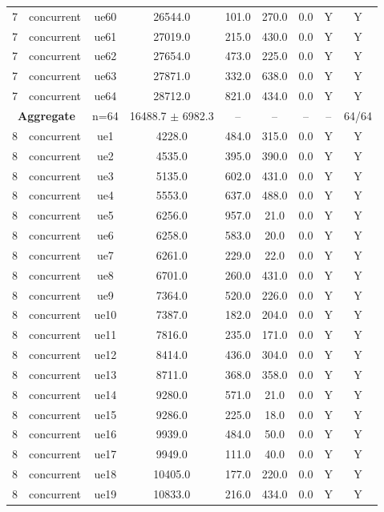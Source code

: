 \begin{table}[ht]
\begin{tabular}{|c|c|c|c|c|c|c|c|c|}
7 & concurrent & ue60 & 26544.0 & 101.0 & 270.0 & 0.0 & Y & Y \\
7 & concurrent & ue61 & 27019.0 & 215.0 & 430.0 & 0.0 & Y & Y \\
7 & concurrent & ue62 & 27654.0 & 473.0 & 225.0 & 0.0 & Y & Y \\
7 & concurrent & ue63 & 27871.0 & 332.0 & 638.0 & 0.0 & Y & Y \\
7 & concurrent & ue64 & 28712.0 & 821.0 & 434.0 & 0.0 & Y & Y \\
\multicolumn{2}{|c|}{\textbf{Aggregate}} & n=64 & 16488.7 $\pm$ 6982.3 & -- & -- & -- & -- & 64/64 \\
\hline
8 & concurrent & ue1 & 4228.0 & 484.0 & 315.0 & 0.0 & Y & Y \\
8 & concurrent & ue2 & 4535.0 & 395.0 & 390.0 & 0.0 & Y & Y \\
8 & concurrent & ue3 & 5135.0 & 602.0 & 431.0 & 0.0 & Y & Y \\
8 & concurrent & ue4 & 5553.0 & 637.0 & 488.0 & 0.0 & Y & Y \\
8 & concurrent & ue5 & 6256.0 & 957.0 & 21.0 & 0.0 & Y & Y \\
8 & concurrent & ue6 & 6258.0 & 583.0 & 20.0 & 0.0 & Y & Y \\
8 & concurrent & ue7 & 6261.0 & 229.0 & 22.0 & 0.0 & Y & Y \\
8 & concurrent & ue8 & 6701.0 & 260.0 & 431.0 & 0.0 & Y & Y \\
8 & concurrent & ue9 & 7364.0 & 520.0 & 226.0 & 0.0 & Y & Y \\
8 & concurrent & ue10 & 7387.0 & 182.0 & 204.0 & 0.0 & Y & Y \\
8 & concurrent & ue11 & 7816.0 & 235.0 & 171.0 & 0.0 & Y & Y \\
8 & concurrent & ue12 & 8414.0 & 436.0 & 304.0 & 0.0 & Y & Y \\
8 & concurrent & ue13 & 8711.0 & 368.0 & 358.0 & 0.0 & Y & Y \\
8 & concurrent & ue14 & 9280.0 & 571.0 & 21.0 & 0.0 & Y & Y \\
8 & concurrent & ue15 & 9286.0 & 225.0 & 18.0 & 0.0 & Y & Y \\
8 & concurrent & ue16 & 9939.0 & 484.0 & 50.0 & 0.0 & Y & Y \\
8 & concurrent & ue17 & 9949.0 & 111.0 & 40.0 & 0.0 & Y & Y \\
8 & concurrent & ue18 & 10405.0 & 177.0 & 220.0 & 0.0 & Y & Y \\
8 & concurrent & ue19 & 10833.0 & 216.0 & 434.0 & 0.0 & Y & Y \\

\end{tabular}
\end{table}
